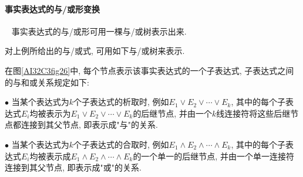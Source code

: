 \paragraph{事实表达式的与/或形变换}~{}
    事实表达式的与/或形可用一棵与/或树表示出来.
\begin{example}
对上例所给出的与/或式, 可用如下与/或树来表示.

在图\ref{AI32C3fig26}中, 每个节点表示该事实表达式的一个子表达式, 子表达式之间的与和或关系规定如下:

$\bullet$ 当某个表达式为$k$个子表达式的析取时, 例如$E_1\vee E_2\vee \cdots \vee E_k$, 其中的每个子表达式$E_i$均被表示为$E_1\vee E_2\vee \cdots \vee E_k$的后继节点, 并由一个$k$线连接符将这些后继节点都连接到其父节点, 即表示成"与"的关系.

$\bullet$ 当某个表达式为$k$个子表达式的合取时, 例如$E_1\wedge E_2\wedge \cdots \wedge E_k$, 其中的每个子表达式$E_i$均被表示成$E_1\wedge E_2\wedge \cdots \wedge E_k$的一个单一的后继节点, 并由一个单一连接符连接到其父节点, 即表示成"或"的关系.
\begin{figure}[H]
\begin{center}
\end{center}
\end{figure}
\end{example}
